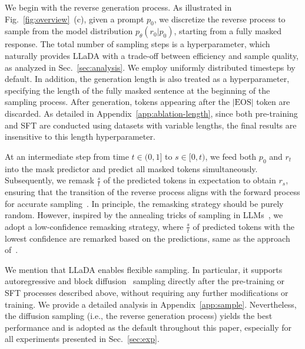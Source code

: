 \documentclass{article}
\newcommand{\cx}[1]{{\color{green}{[[\textbf{cx: }#1]]}}}
\begin{document}
We begin with the reverse generation process. As illustrated in Fig.~\ref{fig:overview}~(c), given a prompt \(p_0\), we discretize the reverse process to sample from the model distribution \(p_\theta(r_0|p_0)\), starting from a fully masked response. The total number of sampling steps is a hyperparameter, which naturally provides LLaDA with a trade-off between efficiency and sample quality, as analyzed in Sec.~\ref{sec:analysis}. We employ uniformly distributed timesteps by default. In addition, the generation length is also treated as a hyperparameter, specifying the length of the fully masked sentence at the beginning of the sampling process. After generation, tokens appearing after the $|\text{EOS}|$ token are discarded. As detailed in Appendix~\ref{app:ablation-length}, since both pre-training and SFT are conducted using datasets with variable lengths, the final results are insensitive to this length hyperparameter.

At an intermediate step from time \(t \in (0, 1]\) to \(s \in [0, t)\), we feed both \(p_0\) and \(r_t\) into the mask predictor and predict all masked tokens simultaneously. Subsequently, we remask \(\frac{s}{t}\) of the predicted tokens in expectation to obtain \(r_s\), ensuring that the transition of the reverse process aligns with the forward process for accurate sampling~\citep{shi2024simplified, sahoo2024simple, ou2024your}. In principle, the remasking strategy should be purely random. However, inspired by the annealing tricks of sampling in LLMs~\citep{brown2020language,holtzman2019curious}, we adopt a low-confidence remasking strategy, where \(\frac{s}{t}\) of predicted tokens with the lowest confidence are remarked based on the predictions, same as the approach of~\citet{chang2022maskgit}.



We mention that LLaDA enables flexible sampling. In particular, it supports autoregressive and block diffusion~\citep{arriola2025block} sampling directly after the pre-training or SFT processes described above, without requiring any further modifications or training. We provide a detailed analysis in Appendix~\ref{app:sample}. Nevertheless, the diffusion sampling (i.e., the reverse generation process) yields the best performance and is adopted as the default throughout this paper, especially for all experiments presented in Sec.~\ref{sec:exp}.
\end{document}

